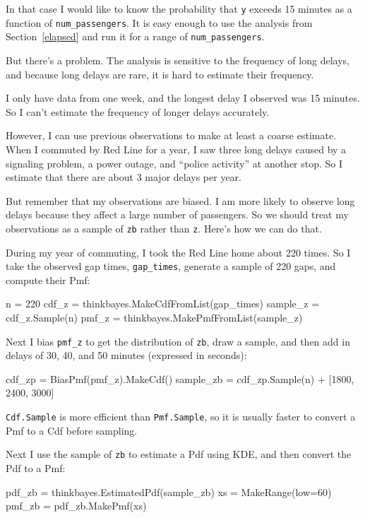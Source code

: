 \documentclass[12pt]{book}
\theoremstyle{exercise}
\begin{document}
In that case I would like to know the probability that {\tt y} exceeds
15 minutes as a function of \verb"num_passengers".  It is easy enough
to use the
analysis from Section~\ref{elapsed} and run it for a range of
\verb"num_passengers".

But there's a problem.
The analysis is sensitive to the frequency of long delays, and
because long delays are rare, it is hard to estimate
their frequency.

I only have data from one week,
and the longest delay I observed was 15 minutes.  So I can't
estimate the frequency of longer delays accurately.

However, I can use previous observations to make at least a coarse
estimate.  When I commuted by Red Line for a year, I saw three long
delays caused by a signaling problem, a power outage, and ``police
activity'' at another stop.  So I estimate that there are about
3 major delays per year.

But remember that my observations are biased.  I am more likely
to observe long delays because they affect a large number
of passengers.  So we should treat my observations as a sample
of {\tt zb} rather than {\tt z}.  Here's how we can do that.

During my year of commuting, I took the Red Line home about 220
times.  So I take the observed gap times, \verb"gap_times",
generate a sample of 220 gaps, and compute their Pmf:

\begin{code}
    n = 220
    cdf_z = thinkbayes.MakeCdfFromList(gap_times)
    sample_z = cdf_z.Sample(n)
    pmf_z = thinkbayes.MakePmfFromList(sample_z)
\end{code}

Next I bias \verb"pmf_z" to get the distribution of
{\tt zb}, draw a sample, and then add in delays of
30, 40, and 50 minutes (expressed in seconds):

\begin{code}
    cdf_zp = BiasPmf(pmf_z).MakeCdf()
    sample_zb = cdf_zp.Sample(n) + [1800, 2400, 3000]
\end{code}

{\tt Cdf.Sample} is more efficient than {\tt Pmf.Sample}, so it
is usually faster to convert a Pmf to a Cdf before sampling.

Next I use the sample of {\tt zb} to estimate a Pdf using
KDE, and then convert the Pdf to a Pmf:

\begin{code}
    pdf_zb = thinkbayes.EstimatedPdf(sample_zb)
    xs = MakeRange(low=60)
    pmf_zb = pdf_zb.MakePmf(xs)
\end{code}
\end{document}
